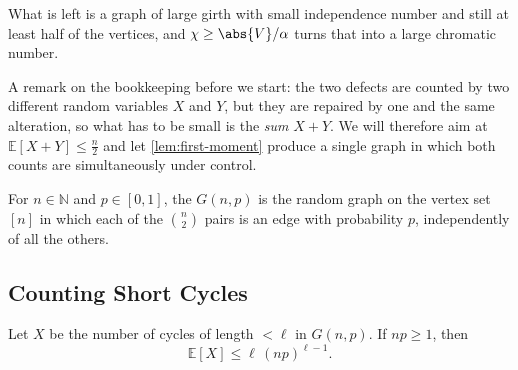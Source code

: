 What is left is a graph of large girth with small independence number and still at least half of the vertices, and \(\chi \ge \abs{V}/\alpha\) turns that into a large chromatic number.

A remark on the bookkeeping before we start: the two defects are counted by two different random variables \(X\) and \(Y\), but they are repaired by one and the same alteration, so what has to be small is the \emph{sum} \(X + Y\). We will therefore aim at \(\mathbb{E}[X + Y] \le \frac{n}{2}\) and let \autoref{lem:first-moment} produce a single graph in which both counts are simultaneously under control.

\begin{definition}\label{def:gnp}
    For \(n \in \mathbb{N}\) and \(p \in [0,1]\), the  \(G(n,p)\) is the random graph on the vertex set \([n]\) in which each of the \(\binom{n}{2}\) pairs is an edge with probability \(p\), independently of all the others.
\end{definition}

\subsection{Counting Short Cycles}

\begin{lemma}\label{lem:few-short-cycles}
    Let \(X\) be the number of cycles of length \(< \ell\) in \(G(n,p)\). If \(np \ge 1\), then
    \[
        \mathbb{E}[X] \le \ell \, (np)^{\ell - 1}.
    \]
\end{lemma}

